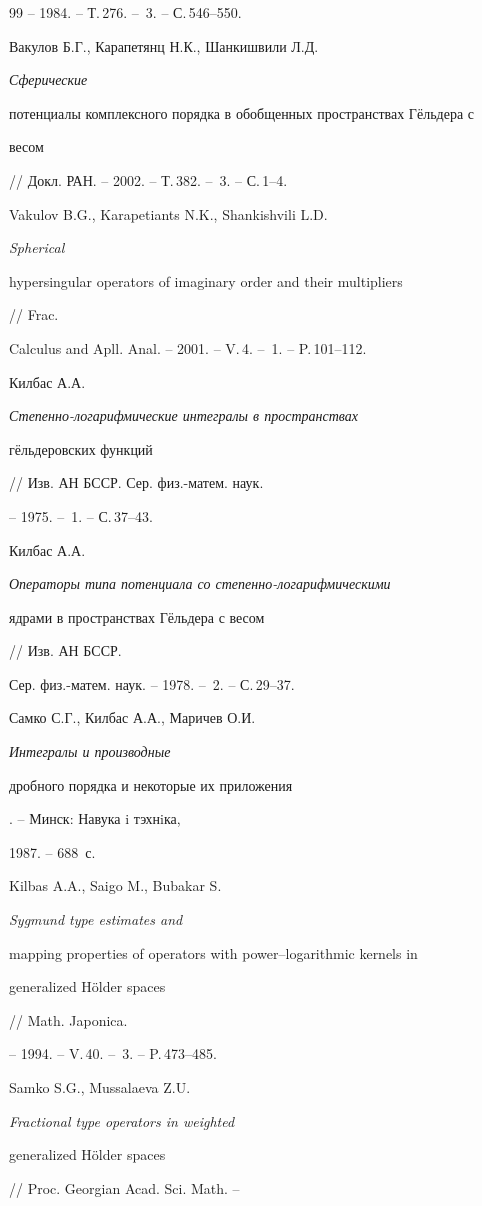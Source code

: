 \begin{thebibliography}{99}
-- 1984. -- Т.\,276. -- \No\,3. -- С.\,546--550.




Вакулов Б.Г., Карапетянц Н.К., Шанкишвили Л.Д. {\it Сферические


потенциалы комплексного порядка в обобщенных пространствах Г\"ельдера с


весом} // Докл. РАН. -- 2002. -- Т.\,382. -- \No\,3. -- С.\,1--4.




Vakulov B.G., Karapetiants N.K., Shankishvili L.D. {\it Spherical


hypersingular operators of imaginary order and their multipliers} // Frac.


Calculus and Apll. Anal. -- 2001. -- V.\,4. -- \No\,1. -- P.\,101--112.




Килбас А.А. {\it Степенно-логарифмические интегралы в пространствах


г\"ельдеровских функций} // Изв. АН БССР. Сер. физ.-матем. наук.


-- 1975. -- \No\,1. -- С.\,37--43.




Килбас А.А. {\it Операторы типа потенциала со степенно-логарифмическими 


ядрами в пространствах Г\"ельдера с весом} // Изв. АН БССР.


Сер. физ.-матем. наук. -- 1978. -- \No\,2. -- С.\,29--37.




Самко С.Г., Килбас А.А., Маричев О.И. {\it Интегралы и производные


дробного порядка и некоторые их приложения}. -- Минск: Навука i тэхнiка,


1987. -- 688~с.




Kilbas A.A., Saigo M., Bubakar S. {\it Sygmund type estimates and


mapping properties of operators with power--logarithmic kernels in


generalized H\"older spaces} // Math. Japonica.


-- 1994. -- V.\,40. -- \No\,3. -- P.\,473--485.




Samko S.G., Mussalaeva Z.U. {\it Fractional type operators in weighted


generalized H\"older spaces} // Proc. Georgian Acad. Sci. Math. --



\end{thebibliography}

